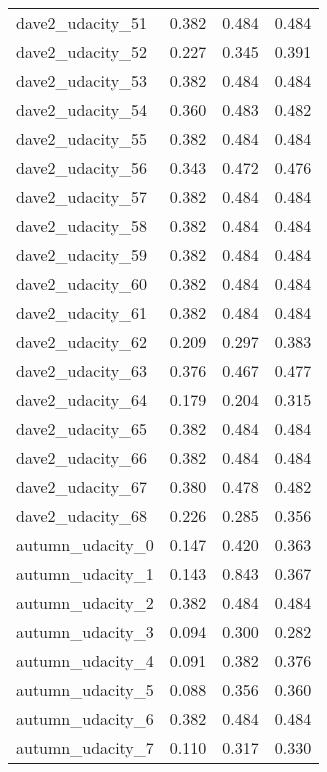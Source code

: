 \begin{tabular}{lrrr}
dave2\_udacity\_51  &          0.382 &   0.484 &   0.484 \\
dave2\_udacity\_52  &          0.227 &   0.345 &   0.391 \\
dave2\_udacity\_53  &          0.382 &   0.484 &   0.484 \\
dave2\_udacity\_54  &          0.360 &   0.483 &   0.482 \\
dave2\_udacity\_55  &          0.382 &   0.484 &   0.484 \\
dave2\_udacity\_56  &          0.343 &   0.472 &   0.476 \\
dave2\_udacity\_57  &          0.382 &   0.484 &   0.484 \\
dave2\_udacity\_58  &          0.382 &   0.484 &   0.484 \\
dave2\_udacity\_59  &          0.382 &   0.484 &   0.484 \\
dave2\_udacity\_60  &          0.382 &   0.484 &   0.484 \\
dave2\_udacity\_61  &          0.382 &   0.484 &   0.484 \\
dave2\_udacity\_62  &          0.209 &   0.297 &   0.383 \\
dave2\_udacity\_63  &          0.376 &   0.467 &   0.477 \\
dave2\_udacity\_64  &          0.179 &   0.204 &   0.315 \\
dave2\_udacity\_65  &          0.382 &   0.484 &   0.484 \\
dave2\_udacity\_66  &          0.382 &   0.484 &   0.484 \\
dave2\_udacity\_67  &          0.380 &   0.478 &   0.482 \\
dave2\_udacity\_68  &          0.226 &   0.285 &   0.356 \\
autumn\_udacity\_0  &          0.147 &   0.420 &   0.363 \\
autumn\_udacity\_1  &          0.143 &   0.843 &   0.367 \\
autumn\_udacity\_2  &          0.382 &   0.484 &   0.484 \\
autumn\_udacity\_3  &          0.094 &   0.300 &   0.282 \\
autumn\_udacity\_4  &          0.091 &   0.382 &   0.376 \\
autumn\_udacity\_5  &          0.088 &   0.356 &   0.360 \\
autumn\_udacity\_6  &          0.382 &   0.484 &   0.484 \\
autumn\_udacity\_7  &          0.110 &   0.317 &   0.330 \\

\end{tabular}
